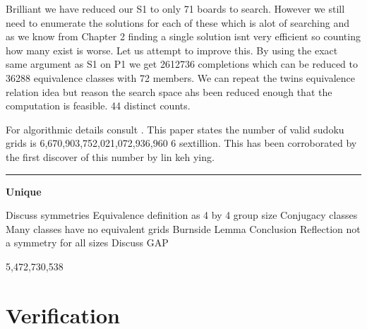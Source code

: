\documentclass[a4paper,11pt]{report}
\newcounter{row}
\newcounter{col}
\newcounter{rowb}
\newcounter{colb}
\newcommand\setrowb[3]{
  \setcounter{colb}{1}
  \foreach \n in {#1, #2, #3} {
    \edef\x{\value{colb} - 0.5}
    \edef\y{3.5 - \value{rowb}}
    \node[anchor=center] at (\x, \y) {\n};
    \stepcounter{colb}
  }
  \stepcounter{rowb}
}
\begin{document}
\begin{figure}[h!]
\centering
{}
\caption{\label{fig:twins}}
\end{figure}

Brilliant we have reduced our S1 to only 71 boards to search. However we still need to enumerate the solutions for each of these which is alot of searching and as we know from Chapter 2 finding a single solution isnt very efficient so counting how many exist is worse. Let us attempt to improve this. By using the exact same argument as S1 on P1 we get 2612736 completions which can be reduced to 36288 equivalence classes with 72 members. We can repeat the twins equivalence relation idea but \cite{} reason the search space ahs been reduced enough that the computation is feasible. 44 distinct counts.

For algorithmic details consult \cite{}. This paper states the number of valid sudoku grids is 6,670,903,752,021,072,936,960 6 sextillion. This has been corroborated by the first discover of this number by \cite{} lin keh ying.
 
 \noindent\rule{4cm}{0.4pt}
 
\textbf{Unique} 

Discuss symmetries
Equivalence definition as 4 by 4
group size
Conjugacy classes
Many classes have no equivalent grids
Burnside Lemma
Conclusion
Reflection not a symmetry for all sizes
Discuss GAP

5,472,730,538

\section{Verification}
\end{document}
